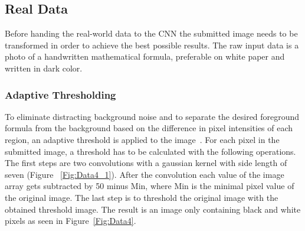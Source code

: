 \documentclass[@CLASSOPTIONS@]{tumarticle}
\begin{document}
\subsection{Real Data}
\label{subsec:realdata}
Before handing the real-world data to the CNN the submitted image needs
to be transformed in order to achieve the best possible results.
The raw input data is a photo of a handwritten mathematical formula, preferable on white paper
and written in dark color.

\subsubsection{Adaptive Thresholding}

To eliminate distracting background noise and to separate the desired foreground formula
from the background based on the difference in pixel intensities of each region,
an adaptive threshold is applied to the image~\cite{threshold}.
For each pixel in the submitted image, a threshold has to be calculated with the following operations.
The first steps are two convolutions with a gaussian kernel with side length of seven (Figure ~\ref{Fig:Data4_1}).
After the convolution each value of the image array gets subtracted by 50 minus Min, where Min is the
minimal pixel value of the original image.
The last step is to threshold the original image with the obtained threshold image.
The result is an image only containing black and white pixels as seen in Figure~\ref{Fig:Data4}.
\end{document}
